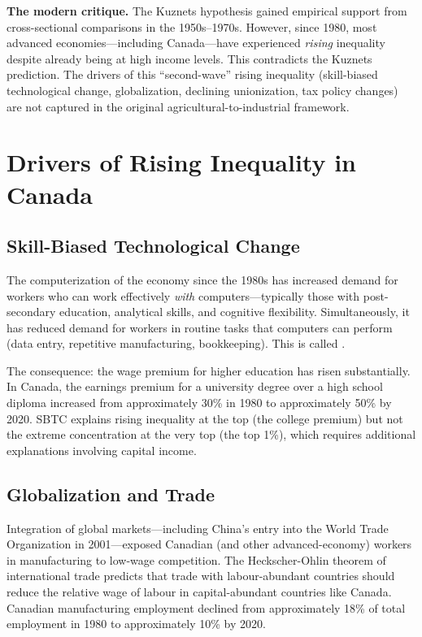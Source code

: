 \textbf{The modern critique.} The Kuznets hypothesis gained empirical support from cross-sectional comparisons in the 1950s--1970s. However, since 1980, most advanced economies---including Canada---have experienced \textit{rising} inequality despite already being at high income levels. This contradicts the Kuznets prediction. The drivers of this ``second-wave'' rising inequality (skill-biased technological change, globalization, declining unionization, tax policy changes) are not captured in the original agricultural-to-industrial framework.

\section{Drivers of Rising Inequality in Canada}

\subsection{Skill-Biased Technological Change}

The computerization of the economy since the 1980s has increased demand for workers who can work effectively \textit{with} computers---typically those with post-secondary education, analytical skills, and cognitive flexibility. Simultaneously, it has reduced demand for workers in routine tasks that computers can perform (data entry, repetitive manufacturing, bookkeeping). This is called .

The consequence: the wage premium for higher education has risen substantially. In Canada, the earnings premium for a university degree over a high school diploma increased from approximately 30\% in 1980 to approximately 50\% by 2020. SBTC explains rising inequality at the top (the college premium) but not the extreme concentration at the very top (the top 1\%), which requires additional explanations involving capital income.

\subsection{Globalization and Trade}

Integration of global markets---including China's entry into the World Trade Organization in 2001---exposed Canadian (and other advanced-economy) workers in manufacturing to low-wage competition. The Heckscher-Ohlin theorem of international trade predicts that trade with labour-abundant countries should reduce the relative wage of labour in capital-abundant countries like Canada. Canadian manufacturing employment declined from approximately 18\% of total employment in 1980 to approximately 10\% by 2020.

